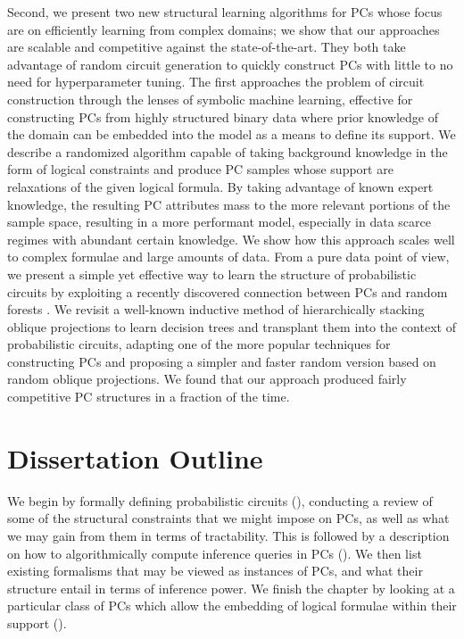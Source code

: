 Second, we present two new structural learning algorithms for PCs whose focus are on efficiently
learning from complex domains; we show that our approaches are scalable and competitive against the
state-of-the-art. They both take advantage of random circuit generation to quickly construct PCs
with little to no need for hyperparameter tuning. The first approaches the problem of circuit
construction through the lenses of symbolic machine learning, effective for constructing PCs from
highly structured binary data where prior knowledge of the domain can be embedded into the model as
a means to define its support. We describe a randomized algorithm capable of taking background
knowledge in the form of logical constraints and produce PC samples whose support are relaxations
of the given logical formula. By taking advantage of known expert knowledge, the resulting PC
attributes mass to the more relevant portions of the sample space, resulting in a more performant
model, especially in data scarce regimes with abundant certain knowledge. We show how this approach
scales well to complex formulae and large amounts of data. From a pure data point of view, we
present a simple yet effective way to learn the structure of probabilistic circuits by exploiting a
recently discovered connection between PCs and random forests \citep{correia20}. We revisit a
well-known inductive method of hierarchically stacking oblique projections to learn decision trees
\citep{dasgupta08a,dasgupta08b} and transplant them into the context of probabilistic circuits,
adapting one of the more popular techniques for constructing PCs and proposing a simpler and faster
random version based on random oblique projections. We found that our approach produced fairly
competitive PC structures in a fraction of the time.

\section{Dissertation Outline}

We begin  by formally defining probabilistic circuits (), conducting a
review of some of the structural constraints that we might impose on PCs, as well as what we may
gain from them in terms of tractability. This is followed by a description on how to
algorithmically compute inference queries in PCs (). We then list existing formalisms
that may be viewed as instances of PCs, and what their structure entail in terms of inference
power. We finish the chapter by looking at a particular class of PCs which allow the embedding of
logical formulae within their support ().

